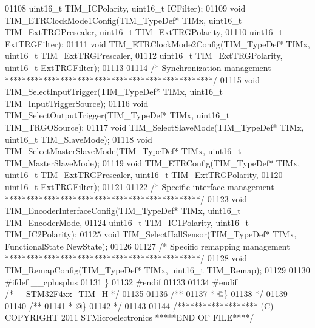\begin{DoxyCode}
01108                                 uint16\_t TIM\_ICPolarity, uint16\_t ICFilter);
01109 \textcolor{keywordtype}{void} TIM_ETRClockMode1Config(TIM\_TypeDef* TIMx, uint16\_t TIM\_ExtTRGPrescaler, uint16\_t 
      TIM\_ExtTRGPolarity,
01110                              uint16\_t ExtTRGFilter);
01111 \textcolor{keywordtype}{void} TIM_ETRClockMode2Config(TIM\_TypeDef* TIMx, uint16\_t TIM\_ExtTRGPrescaler,
01112                              uint16\_t TIM\_ExtTRGPolarity, uint16\_t ExtTRGFilter);
01113 
01114 \textcolor{comment}{/* Synchronization management *************************************************/}
01115 \textcolor{keywordtype}{void} TIM_SelectInputTrigger(TIM\_TypeDef* TIMx, uint16\_t TIM\_InputTriggerSource);
01116 \textcolor{keywordtype}{void} TIM_SelectOutputTrigger(TIM\_TypeDef* TIMx, uint16\_t TIM\_TRGOSource);
01117 \textcolor{keywordtype}{void} TIM_SelectSlaveMode(TIM\_TypeDef* TIMx, uint16\_t TIM\_SlaveMode);
01118 \textcolor{keywordtype}{void} TIM_SelectMasterSlaveMode(TIM\_TypeDef* TIMx, uint16\_t TIM\_MasterSlaveMode);
01119 \textcolor{keywordtype}{void} TIM_ETRConfig(TIM\_TypeDef* TIMx, uint16\_t TIM\_ExtTRGPrescaler, uint16\_t TIM\_ExtTRGPolarity,
01120                    uint16\_t ExtTRGFilter);
01121 
01122 \textcolor{comment}{/* Specific interface management **********************************************/}
01123 \textcolor{keywordtype}{void} TIM_EncoderInterfaceConfig(TIM\_TypeDef* TIMx, uint16\_t TIM\_EncoderMode,
01124                                 uint16\_t TIM\_IC1Polarity, uint16\_t TIM\_IC2Polarity);
01125 \textcolor{keywordtype}{void} TIM_SelectHallSensor(TIM\_TypeDef* TIMx, FunctionalState NewState);
01126 
01127 \textcolor{comment}{/* Specific remapping management **********************************************/}
01128 \textcolor{keywordtype}{void} TIM_RemapConfig(TIM\_TypeDef* TIMx, uint16\_t TIM\_Remap);
01129 
01130 \textcolor{preprocessor}{#}\textcolor{preprocessor}{ifdef} \_\_cplusplus
01131 \}
01132 \textcolor{preprocessor}{#}\textcolor{preprocessor}{endif}
01133 
01134 \textcolor{preprocessor}{#}\textcolor{preprocessor}{endif} \textcolor{comment}{/*\_\_STM32F4xx\_TIM\_H */}
01135 
01136 \textcolor{comment}{/**}
01137 \textcolor{comment}{  * @\}}
01138 \textcolor{comment}{  */}
01139 
01140 \textcolor{comment}{/**}
01141 \textcolor{comment}{  * @\}}
01142 \textcolor{comment}{  */}
01143 
01144 \textcolor{comment}{/******************* (C) COPYRIGHT 2011 STMicroelectronics *****END OF FILE****/}
\end{DoxyCode}
